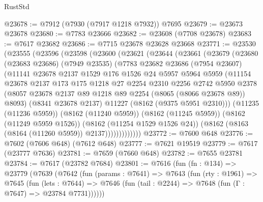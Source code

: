 \begin{lexlean}{RustStd}
\begin{coremodule}
@23678 := @7912 (@7930 (@7917 @1218 @7932)) @7695
@23679 := @23673 @23678
@23680 := @7783 @23666
@23682 := @23608 (@7708 @23678)
@23683 := @7617 @23682
@23686 := @7715 @23678 @23628 @23668
@23771 := @23530
    (@23555
      (@23596
        (@23598
          (@23600
            (@23621
              (@23644
                (@23661
                  (@23679
                    (@23680
                      (@23683 @23686)
                      (@7949 @23535)
                      (@7783
                        @23682
                        @23686
                        (@7954 @23607)
                        (@11141
                          @23678
                          @2137
                          @1529
                          @176
                          @1526
                          @24
                          @5957
                          @5964
                          @5959
                          (@11154
                            @23678
                            @2137
                            @173
                            @175
                            @1218
                            @27
                            @2254
                            @2310
                            @2256
                            @2742
                            @5950
                            @2378
                            (@8057
                              @23678
                              @2137
                              @89
                              @1218
                              @89
                              @2254
                              (@8065 (@8066 @23678 @89))
                              @8093)
                            (@8341 @23678 @2137)
                            @11227
                            (@8162 (@9375 @5951 @2310)))
                          (@11235 (@11236 @5959))
                          (@8162 (@11240 @5959))
                          (@8162 (@11245 @5959))
                          (@8162 (@11249 @5959 @1526))
                          (@8162 (@11254 @1529 @1526 @24))
                          (@8162 (@8163 (@8164 (@11260 @5959)) @2137)))))))))))))
@23772 := @7600 @648
@23776 := @7602 (@7606 @648) (@7612 @648)
@23777 := @7621 @19519
@23779 := @7617 (@23777 @7636)
@23781 := @7659 (@7660 @648)
@23782 := @7655 @23781
@23784 := @7617 (@23782 @7684)
@23801 := @7616
    (fun (fn : @134) =>
    @23779
      (@7639
        (@7642
          (fun (params : @7641) =>
          @7643
            (fun (rty : @1961) =>
            @7645
              (fun (lets : @7644) =>
              @7646 (fun (tail : @2244) => @7648 (fun (Γ : @7647) => @23784 @7731))))))

\end{coremodule}
\end{lexlean}
